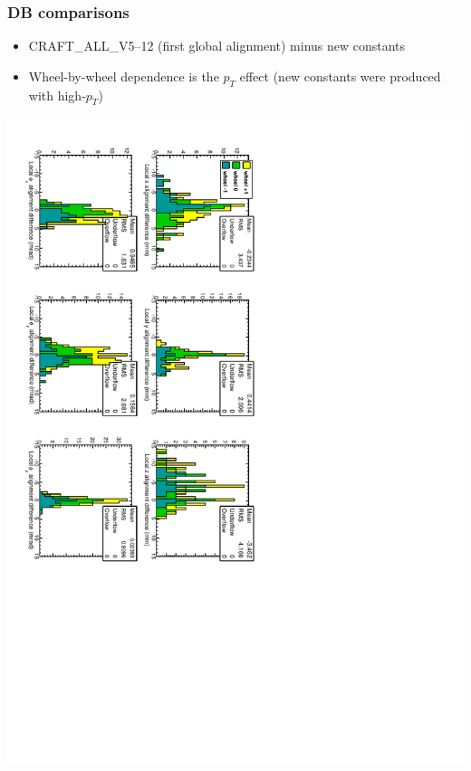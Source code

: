 \documentclass[compress]{beamer}
\begin{document}
\begin{frame}
\frametitle{DB comparisons}

\begin{itemize}
\item CRAFT\_ALL\_V5--12 (first global alignment) minus new constants
\item Wheel-by-wheel dependence is the $p_T$ effect (new constants were produced with high-$p_T$)
\end{itemize}

\vfill\includegraphics[height=\linewidth, angle=90]{hip_difference_v11all.pdf}
\end{frame}
\end{document}
